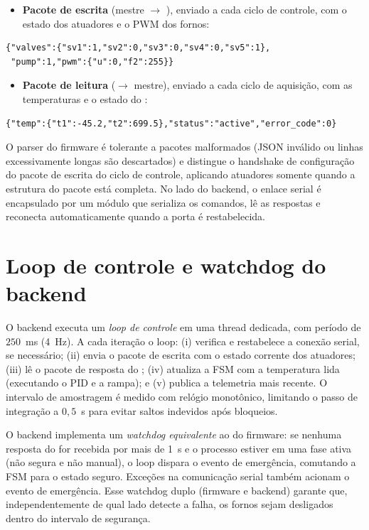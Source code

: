 \begin{itemize}
  \item \textbf{Pacote de escrita} (mestre $\to$ \daq), enviado a cada ciclo de
  controle, com o estado dos atuadores e o PWM dos fornos:
\end{itemize}
\begin{verbatim}
{"valves":{"sv1":1,"sv2":0,"sv3":0,"sv4":0,"sv5":1},
 "pump":1,"pwm":{"u":0,"f2":255}}
\end{verbatim}

\begin{itemize}
  \item \textbf{Pacote de leitura} (\daq $\to$ mestre), enviado a cada ciclo de
  aquisi\c{c}\~ao, com as temperaturas e o estado do \daq:
\end{itemize}
\begin{verbatim}
{"temp":{"t1":-45.2,"t2":699.5},"status":"active","error_code":0}
\end{verbatim}

O parser do firmware \'e tolerante a pacotes malformados (JSON inv\'alido ou
linhas excessivamente longas s\~ao descartados) e distingue o handshake de
configura\c{c}\~ao do pacote de escrita do ciclo de controle, aplicando atuadores
somente quando a estrutura do pacote est\'a completa. No lado do backend, o
enlace serial \'e encapsulado por um m\'odulo que serializa os comandos, l\^e as
respostas e reconecta automaticamente quando a porta \'e restabelecida.

\section{Loop de controle e watchdog do backend}

O backend executa um \emph{loop de controle} em uma thread dedicada, com
per\'iodo de $250$~ms (4~Hz). A cada itera\c{c}\~ao o loop: (i) verifica e
restabelece a conex\~ao serial, se necess\'ario; (ii) envia o pacote de escrita
com o estado corrente dos atuadores; (iii) l\^e o pacote de resposta do \daq;
(iv) atualiza a FSM com a temperatura lida (executando o PID e a rampa); e
(v) publica a telemetria mais recente. O intervalo de amostragem \'e medido com
rel\'ogio monot\^onico, limitando o passo de integra\c{c}\~ao a $0{,}5$~s para
evitar saltos indevidos ap\'os bloqueios.

O backend implementa um \emph{watchdog equivalente} ao do firmware: se nenhuma
resposta do \daq for recebida por mais de 1~s e o processo estiver em uma fase
ativa (n\~ao segura e n\~ao manual), o loop dispara o evento de emerg\^encia,
comutando a FSM para o estado seguro. Exce\c{c}\~oes na comunica\c{c}\~ao serial
tamb\'em acionam o evento de emerg\^encia. Esse watchdog duplo (firmware e
backend) garante que, independentemente de qual lado detecte a falha, os fornos
sejam desligados dentro do intervalo de seguran\c{c}a.

